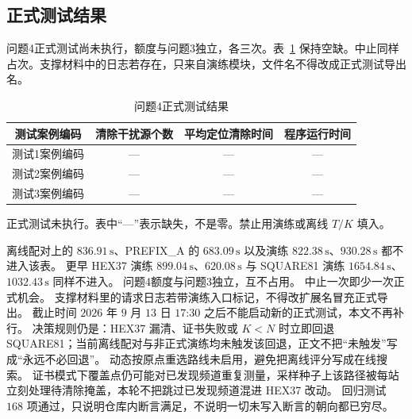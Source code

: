\subsection{正式测试结果}

问题4正式测试尚未执行，额度与问题3独立，各三次。表~\ref{tab:q4_formal} 保持空缺。中止同样占次。支撑材料中的日志若存在，只来自演练模块，文件名不得改成正式测试导出名。

\begin{table}[H]
\centering
\caption{问题4正式测试结果}
\label{tab:q4_formal}
\begin{tabular}{cccc}
\hline
测试案例编码 & 清除干扰源个数 & 平均定位清除时间 & 程序运行时间 \\
\hline
测试1案例编码 & --- & --- & --- \\
测试2案例编码 & --- & --- & --- \\
测试3案例编码 & --- & --- & --- \\
\hline
\end{tabular}

\vspace{0.4em}
{\small 正式测试未执行。表中“---”表示缺失，不是零。禁止用演练或离线 $T/K$ 填入。}
\end{table}

离线配对上的 $836.91\,\mathrm{s}$、PREFIX\_A 的 $683.09\,\mathrm{s}$ 以及演练 $822.38\,\mathrm{s}$、$930.28\,\mathrm{s}$ 都不进入该表。
更早 HEX37 演练 $899.04\,\mathrm{s}$、$620.08\,\mathrm{s}$ 与 SQUARE81 演练 $1654.84\,\mathrm{s}$、$1032.43\,\mathrm{s}$ 同样不进入。
问题4额度与问题3独立，互不占用。
中止一次即少一次正式机会。
支撑材料里的请求日志若带演练入口标记，不得改扩展名冒充正式导出。
截止时间 $2026$ 年 $9$ 月 $13$ 日 $17$:$30$ 之后不能启动新的正式测试，本文不再补行。
决策规则仍是：HEX37 漏清、证书失败或 $K<N$ 时立即回退 SQUARE81；当前离线配对与非正式演练均未触发该回退，正文不把“未触发”写成“永远不必回退”。
动态按原点重选路线未启用，避免把离线评分写成在线搜索。
证书模式下覆盖点仍可能对已发现频道重复测量，采样种子上该路径被每站立刻处理待清除掩盖，本轮不把跳过已发现频道混进 HEX37 改动。
回归测试 $168$ 项通过，只说明仓库内断言满足，不说明一切未写入断言的朝向都已穷尽。
